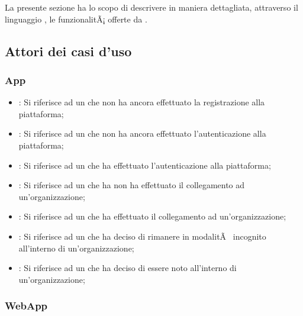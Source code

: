 \documentclass[../analisi-dei-requisiti]{subfiles}
\begin{document}
La presente sezione ha lo scopo di descrivere in maniera dettagliata, attraverso il linguaggio , le funzionalitÃ¡ offerte da .

\subsection{Attori dei casi d'uso}
\label{sub:attori_casi_duso}

\subsubsection{App}
\label{subsub:utenti}

\begin{itemize}
  \item \textbf{}: Si riferisce ad un  che non ha ancora effettuato la registrazione alla piattaforma;
  \item \textbf{}: Si riferisce ad un  che non ha ancora effettuato l'autenticazione alla piattaforma;
  \item \textbf{}: Si riferisce ad un  che ha effettuato l'autenticazione alla piattaforma;
  \item \textbf{}: Si riferisce ad un  che ha non ha effettuato il collegamento ad un'organizzazione;
  \item \textbf{}: Si riferisce ad un  che ha effettuato il collegamento ad un'organizzazione;
  \item \textbf{}: Si riferisce ad un  che ha deciso di rimanere in modalitÃ  incognito all'interno di un'organizzazione;
  \item \textbf{}: Si riferisce ad un  che ha deciso di essere noto all'interno di un'organizzazione;
\end{itemize}

\subsubsection{WebApp}
\label{subsub:super_utenti}
\end{document}
